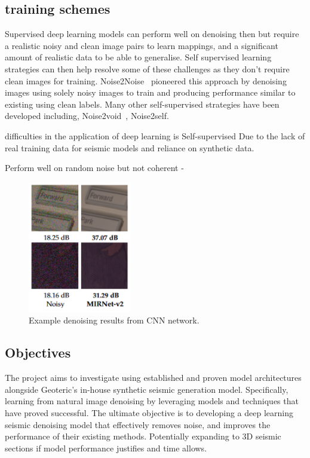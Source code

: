\documentclass[project-plan]{report-template}
\begin{document}
\subsection{training schemes}
Supervised deep learning models can perform well on denoising then but require a realistic noisy and clean image pairs to learn mappings, and a significant amount of realistic data to be able to generalise. Self supervised learning strategies can then help resolve some of these challenges as they don't require clean images for training. Noise2Noise~\cite{} pioneered this approach by denoising images using solely noisy images to train and producing performance similar to existing using clean labels. Many other self-supervised strategies have been developed including, Noise2void~\cite{}, Noise2self.

difficulties in the application of deep learning is
Self-supervised 
Due to the  lack of real training data for seismic models and reliance on synthetic data. 

Perform well on random noise but not coherent - 

\begin{figure}[htb]
    \begin{center}
        \includegraphics[width=0.4\textwidth]{latex/figures/noise_removal_ex.png}
    \end{center}
    \caption{\label{fig:experiment} Example denoising results from CNN network.}
\end{figure}

\subsection{Objectives}
The project aims to investigate using established and proven model architectures alongside Geoteric's in-house synthetic seismic generation model. Specifically, learning from natural image denoising by leveraging models and techniques that have proved successful.
The ultimate objective is to developing a deep learning seismic denoising model that effectively removes noise, and improves the performance of their existing methods.  Potentially expanding to 3D seismic sections if model performance justifies and time allows.
\end{document}
